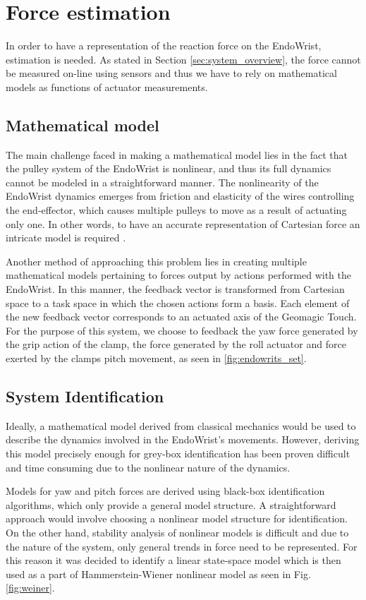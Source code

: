 \section{Force estimation}\label{sec:force_estimation}
In order to have a representation of the reaction force on the EndoWrist, estimation is needed.
As stated in Section \ref{sec:system_overview}, the force cannot be measured on-line using sensors and thus we have to rely on mathematical models as functions of actuator measurements.


\subsection{Mathematical model}
The main challenge faced in making a mathematical model lies in the fact that the pulley system of the EndoWrist is nonlinear, and thus its full dynamics cannot be modeled in a straightforward manner. 
The nonlinearity of the EndoWrist dynamics emerges from friction and elasticity of the wires controlling the end-effector, which causes multiple pulleys to move as a result of actuating only one. 
In other words, to have an accurate representation of Cartesian force an intricate model is required  \cite{kim2014dynamic}.

Another method of approaching this problem lies in creating multiple mathematical models pertaining to forces output by actions performed with the EndoWrist.
In this manner, the feedback vector is transformed from Cartesian space to a task space in which the chosen actions form a basis.
Each element of the new feedback vector corresponds to an actuated axis of the Geomagic Touch.
For the purpose of this system, we choose to feedback the yaw force generated by the grip action of the clamp, the force generated by the roll actuator and force exerted by the clamps pitch movement, as seen in \ref{fig:endowrits_set}.

\subsection{System Identification}
Ideally, a mathematical model derived from classical mechanics would be used to describe the dynamics involved in the EndoWrist's movements.
However, deriving this model precisely enough for grey-box identification has been proven difficult and time consuming due to the nonlinear nature of the dynamics.

Models for yaw and pitch forces are derived using black-box identification algorithms, which only provide a general model structure. 
A straightforward approach would involve choosing a nonlinear model structure for identification.
On the other hand, stability analysis of nonlinear models is difficult and due to the nature of the system, only general trends in force need to be represented.
For this reason it was decided to identify a linear state-space model which is then used as a part of Hammerstein-Wiener  \cite{zhu2002estimation} nonlinear model as seen in Fig. \ref{fig:weiner}.


